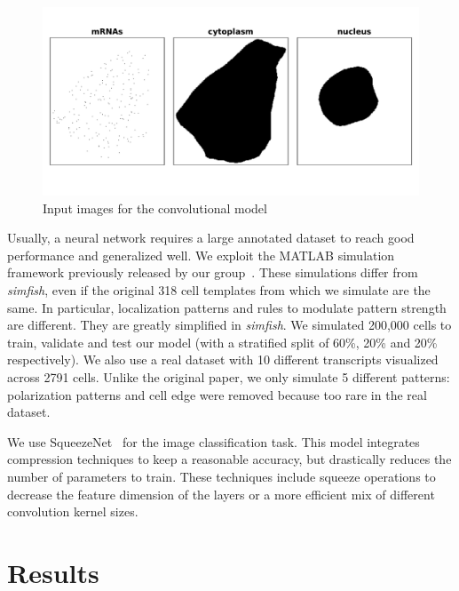 \begin{figure}[h]
    \centering
    \includegraphics[width=\textwidth]{figures/appendix/surface_layers}
    \caption[Input images for the convolutional model]{Input images for the convolutional model}
    \label{fig:surface_layers}
\end{figure}

Usually, a neural network requires a large annotated dataset to reach good performance and generalized well.
We exploit the MATLAB simulation framework previously released by our group~\cite{samacoits_computational_2018}.
These simulations differ from \emph{simfish}, even if the original 318 cell templates from which we simulate are the same.
In particular, localization patterns and rules to modulate pattern strength are different.
They are greatly simplified in \emph{simfish}.
We simulated 200,000 cells to train, validate and test our model (with a stratified split of 60\%, 20\% and 20\% respectively).
We also use a real dataset with 10 different transcripts visualized across 2791 cells.
Unlike the original paper, we only simulate 5 different patterns: polarization patterns and cell edge were removed because too rare in the real dataset.

We use SqueezeNet~\cite{Iandola_2016} for the image classification task.
This model integrates compression techniques to keep a reasonable accuracy, but drastically reduces the number of parameters to train.
These techniques include squeeze operations to decrease the feature dimension of the layers or a more efficient mix of different convolution kernel sizes.

\section{Results}
\label{sec:results_cnn_features}

